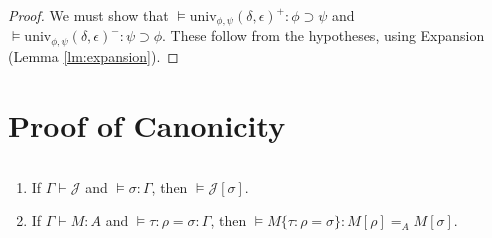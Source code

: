 \documentclass[a4paper,UKenglish]{lipics-v2016}
\newcommand*{\univ}[4]{\ensuremath{\mathrm{univ}_{{#1}, {#2}} \left({#3} , {#4} \right)}}
\theoremstyle{plain}
\theoremstyle{definition}
\begin{document}
\begin{proof}
We must show that $\models \univ{\phi}{\psi}{\delta}{\epsilon}^+ : \phi \supset \psi$ and $\models \univ{\phi}{\psi}{\delta}{\epsilon}^- : \psi \supset \phi$.
These follow from the hypotheses, using Expansion (Lemma \ref{lm:expansion}).
\end{proof}

\section{Proof of Canonicity}

\begin{theorem}
$ $
\begin{enumerate}
\item
If $\Gamma \vdash \mathcal{J}$ and $\models \sigma : \Gamma$, then $\models \mathcal{J} [ \sigma ]$.
\item
If $\Gamma \vdash M : A$ and $\models \tau : \rho = \sigma : \Gamma$, then $\models M \{ \tau : \rho = \sigma \} : M [ \rho ] =_A M [ \sigma ]$.
\end{enumerate}
\end{theorem}
\end{document}
